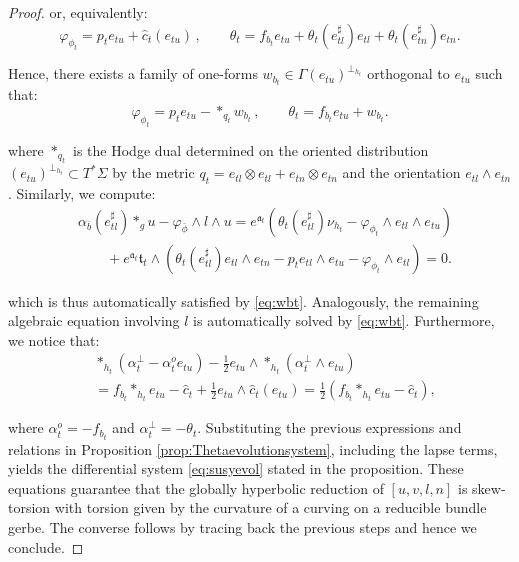 \documentclass[10pt,reqno,a4paper]{amsart}
\theoremstyle{plain}
\theoremstyle{definition}
\theoremstyle{remark}
\theoremstyle{remark}
\def\fra{\mathfrak{a}}
\renewcommand{\(}{ (}
\renewcommand{\)}{ )}
\begin{document}
\begin{proof}
\noindent
or, equivalently:
\begin{equation*}
\varphi_{\phi_t}=p_t e_{tu}+\widehat{c}_t (e_{tu})\, , \qquad
\theta_t=f_{b_t}e_{tu}+\theta_t(e^{\sharp}_{tl})e_{tl}+\theta_t(e^{\sharp}_{tn})e_{tn}.
\end{equation*}

\noindent
Hence, there exists a family of one-forms $w_{b_t}\in\Gamma(e_{tu})^{\perp_{h_t}}$ orthogonal to $e_{tu}$ such that:
\begin{equation}
\label{eq:wbt}
\varphi_{\phi_t}=p_t e_{tu}-\ast_{q_t}w_{b_t}\, , \qquad \theta_t=f_{b_t}e_{tu}+w_{b_t}.
\end{equation}

\noindent
where $\ast_{q_t}$ is the Hodge dual determined on the oriented distribution $(e_{tu})^{\perp_{h_t}}\subset T^{\ast}\Sigma$ by the metric $q_t=e_{tl}\otimes e_{tl}+e_{tn}\otimes e_{tn}$ and the orientation $e_{tl}\wedge e_{tn}$. Similarly, we compute:
\begin{eqnarray*}
& \alpha_{\bar b}(e^{\sharp}_{tl})\ast_g u-\varphi_{\bar\phi}\wedge l\wedge u=e^{\fra_t}(\theta_t(e^{\sharp}_{tl})\nu_{h_t}-\varphi_{\phi_t}\wedge e_{tl}\wedge e_{tu})\\
& \qquad +e^{\fra_t}\mathfrak t_t\wedge(\theta_t(e^{\sharp}_{tl})e_{tl}\wedge e_{tn}-p_t e_{tl}\wedge e_{tu}-\varphi_{\phi_t}\wedge e_{tl})=0.
\end{eqnarray*}

\noindent
which is thus automatically satisfied by \eqref{eq:wbt}. Analogously, the remaining algebraic equation involving $l$ is automatically solved by \eqref{eq:wbt}. Furthermore, we notice that:
\begin{eqnarray*}
& \ast_{h_t}(\alpha_t^{\perp}-\alpha_t^o e_{tu})-\frac{1}{2}e_{tu}\wedge\ast_{h_t}(\alpha_t^{\perp}\wedge e_{tu})\\
& =f_{b_t}\ast_{h_t}e_{tu}-\widehat{c}_t +\frac{1}{2}e_{tu}\wedge\widehat{c}_t (e_{tu})
=\frac{1}{2}(f_{b_t}\ast_{h_t}e_{tu}-\widehat{c}_t ),
\end{eqnarray*}

\noindent
where $\alpha_t^o=-f_{b_t}$ and $\alpha_t^{\perp}=-\theta_t$. Substituting the previous expressions and relations in Proposition \ref{prop:Thetaevolutionsystem}, including the lapse terms, yields the differential system \eqref{eq:susyevol} stated in the proposition. These equations guarantee that the globally hyperbolic reduction of $[u,v,l,n]$ is skew-torsion with torsion given by the curvature of a curving on a reducible bundle gerbe. The converse follows by tracing back the previous steps and hence we conclude.
\end{proof}
\end{document}
